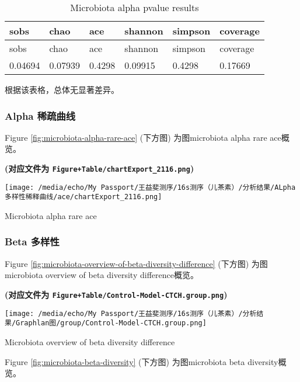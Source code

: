 \documentclass[
]{article}
\begin{document}
\begin{longtable}[]{@{}llllll@{}}
\caption{\label{tab:microbiota-alpha-pvalue-results}Microbiota alpha pvalue results}\tabularnewline
\toprule
sobs & chao & ace & shannon & simpson & coverage\tabularnewline
\midrule
\endfirsthead
\toprule
sobs & chao & ace & shannon & simpson & coverage\tabularnewline
\midrule
\endhead
0.04694 & 0.07939 & 0.4298 & 0.09915 & 0.4298 & 0.17669\tabularnewline
\bottomrule
\end{longtable}

根据该表格，总体无显著差异。

\hypertarget{alpha-ux7a00ux758fux66f2ux7ebf}{%
\subsubsection{Alpha 稀疏曲线}\label{alpha-ux7a00ux758fux66f2ux7ebf}}

Figure \ref{fig:microbiota-alpha-rare-ace} (下方图) 为图microbiota alpha rare ace概览。

\textbf{(对应文件为 \texttt{Figure+Table/chartExport\_2116.png})}

\def\@captype{figure}
\begin{center}
\texttt{[image: /media/echo/My Passport/王益斐测序/16s测序（儿茶素）/分析结果/ALpha多样性稀释曲线/ace/chartExport\_2116.png]}
\caption{Microbiota alpha rare ace}\label{fig:microbiota-alpha-rare-ace}
\end{center}

\hypertarget{beta-ux591aux6837ux6027}{%
\subsubsection{Beta 多样性}\label{beta-ux591aux6837ux6027}}

Figure \ref{fig:microbiota-overview-of-beta-diversity-difference} (下方图) 为图microbiota overview of beta diversity difference概览。

\textbf{(对应文件为 \texttt{Figure+Table/Control-Model-CTCH.group.png})}

\def\@captype{figure}
\begin{center}
\texttt{[image: /media/echo/My Passport/王益斐测序/16s测序（儿茶素）/分析结果/Graphlan图/group/Control-Model-CTCH.group.png]}
\caption{Microbiota overview of beta diversity difference}\label{fig:microbiota-overview-of-beta-diversity-difference}
\end{center}

Figure \ref{fig:microbiota-beta-diversity} (下方图) 为图microbiota beta diversity概览。
\end{document}
